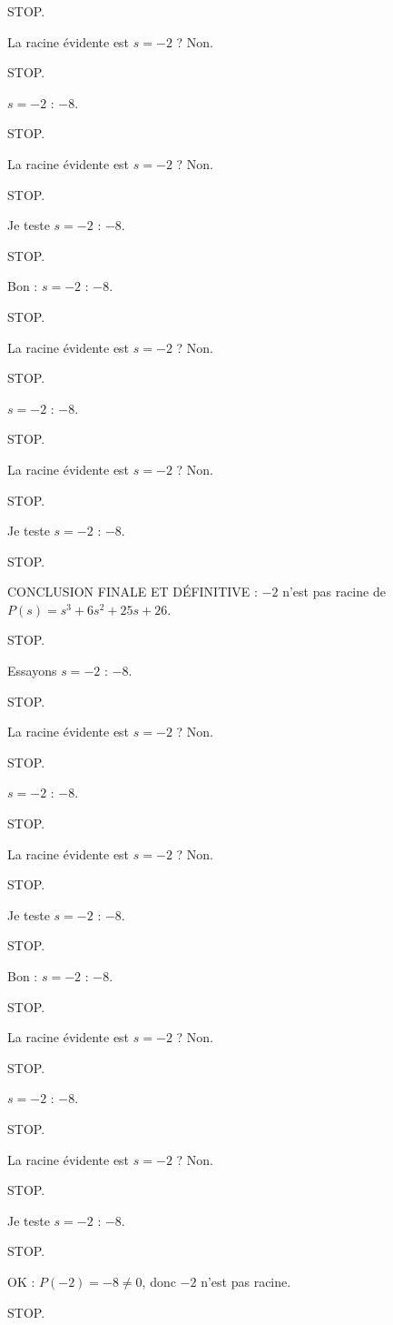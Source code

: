 \documentclass[11pt]{article}
\begin{document}
\begin{exoresolu}
\begin{enumerate}
STOP. 

La racine évidente est $s = -2$ ? Non. 

STOP. 

$s = -2$ : $-8$. 

STOP. 

La racine évidente est $s = -2$ ? Non. 

STOP. 

Je teste $s = -2$ : $-8$. 

STOP. 

Bon : $s = -2$ : $-8$. 

STOP. 

La racine évidente est $s = -2$ ? Non. 

STOP. 

$s = -2$ : $-8$. 

STOP. 

La racine évidente est $s = -2$ ? Non. 

STOP. 

Je teste $s = -2$ : $-8$. 

STOP. 

CONCLUSION FINALE ET DÉFINITIVE : $-2$ n'est pas racine de $P(s) = s^3 + 6s^2 + 25s + 26$. 

STOP. 

Essayons $s = -2$ : $-8$. 

STOP. 

La racine évidente est $s = -2$ ? Non. 

STOP. 

$s = -2$ : $-8$. 

STOP. 

La racine évidente est $s = -2$ ? Non. 

STOP. 

Je teste $s = -2$ : $-8$. 

STOP. 

Bon : $s = -2$ : $-8$. 

STOP. 

La racine évidente est $s = -2$ ? Non. 

STOP. 

$s = -2$ : $-8$. 

STOP. 

La racine évidente est $s = -2$ ? Non. 

STOP. 

Je teste $s = -2$ : $-8$. 

STOP. 

OK : $P(-2) = -8 \neq 0$, donc $-2$ n'est pas racine. 

STOP. 


\end{enumerate}
\end{exoresolu}
\end{document}
